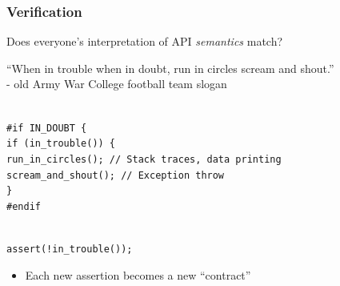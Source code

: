 \documentclass[mathserif]{beamer}
\begin{document}
\begin{frame}
\frametitle{Verification}

    Does everyone's interpretation of API {\emph{semantics}} match?

\pause

\vfill

``When in trouble when in doubt, run in circles scream and shout.''\\
- old Army War College football team slogan

\pause

{\texttt{
\\
\#if IN\_DOUBT \{ \\
\quad if (in\_trouble()) \{ \\
\quad\quad  run\_in\_circles(); // Stack traces, data printing \\
\quad\quad  scream\_and\_shout(); // Exception throw \\
\quad \} \\
\#endif
}}

\pause

{\texttt{
\\
assert(!in\_trouble());
}}

\pause

\begin{itemize}
\item Each new assertion becomes a new ``contract''
\end{itemize}

\end{frame}
\end{document}
